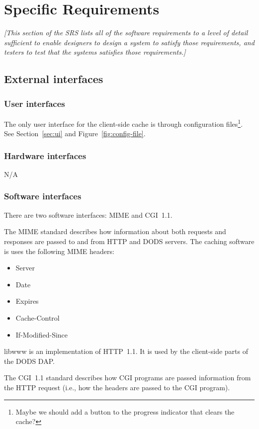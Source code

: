 \documentclass{article}
\begin{document}
\section{Specific Requirements}
\label{sec:specific}
\emph{[This section of the \ac{SRS} lists all of the software requirements to
  a level of detail sufficient to enable designers to design a system to
  satisfy those requirements, and testers to test that the systems satisfies
  those requirements.]}

\subsection{External interfaces}
\subsubsection{User interfaces}
The only user interface for the client-side cache is through configuration
files\footnote{Maybe we should add a button to the progress indicator that
  clears the cache?}. See Section~\ref{sec:ui}
and Figure~\ref{fig:config-file}. 

\subsubsection{Hardware interfaces}
N/A

\subsubsection{Software interfaces}
There are two software interfaces: MIME and \acs{CGI}~1.1\cite{w3c:cgi}. 

The MIME standard describes how information about both requests and responses
are passed to and from HTTP and DODS servers. The caching software is uses
the following MIME headers:
\begin{itemize}
\item Server
\item Date
\item Expires
\item Cache-Control
\item If-Modified-Since 
\end{itemize}

libwww is an implementation of HTTP~1.1. It is used by the client-side parts
of the DODS \ac{DAP}.

The CGI~1.1 standard describes how CGI programs are passed information from
the HTTP request (i.e., how the headers are passed to the CGI program).
\end{document}
